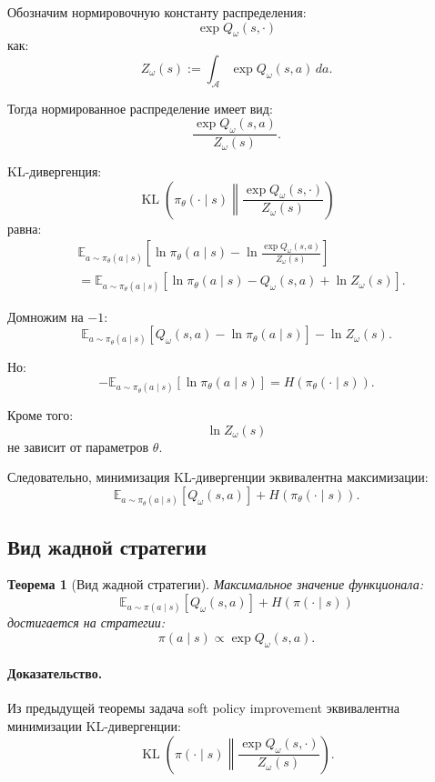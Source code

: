 \documentclass[12pt,a4paper]{article}
\newtheorem{theorem}{Теорема}
\begin{document}
Обозначим нормировочную константу распределения:
\[
\exp Q_\omega(s,\cdot)
\]
как:
\[
Z_\omega(s)
:=
\int_{\mathcal A}
\exp Q_\omega(s,a)
\,da.
\]

Тогда нормированное распределение имеет вид:
\[
\frac{\exp Q_\omega(s,a)}{Z_\omega(s)}.
\]

KL-дивергенция:
\[
\operatorname{KL}
\left(
\pi_\theta(\cdot\mid s)
\middle\|
\frac{\exp Q_\omega(s,\cdot)}{Z_\omega(s)}
\right)
\]
равна:
\[
\begin{aligned}
&
\mathbb E_{a\sim\pi_\theta(a\mid s)}
\left[
\ln\pi_\theta(a\mid s)
-
\ln
\frac{\exp Q_\omega(s,a)}{Z_\omega(s)}
\right]
\\
&=
\mathbb E_{a\sim\pi_\theta(a\mid s)}
\left[
\ln\pi_\theta(a\mid s)
-
Q_\omega(s,a)
+
\ln Z_\omega(s)
\right].
\end{aligned}
\]

Домножим на $-1$:
\[
\mathbb E_{a\sim\pi_\theta(a\mid s)}
\left[
Q_\omega(s,a)
-
\ln\pi_\theta(a\mid s)
\right]
-
\ln Z_\omega(s).
\]

Но:
\[
-\mathbb E_{a\sim\pi_\theta(a\mid s)}
\left[
\ln\pi_\theta(a\mid s)
\right]
=
H(\pi_\theta(\cdot\mid s)).
\]

Кроме того:
\[
\ln Z_\omega(s)
\]
не зависит от параметров $\theta$.

Следовательно, минимизация KL-дивергенции эквивалентна максимизации:
\[
\mathbb E_{a\sim\pi_\theta(a\mid s)}
\left[
Q_\omega(s,a)
\right]
+
H(\pi_\theta(\cdot\mid s)).
\]

\subsection{Вид жадной стратегии}

\begin{theorem}[Вид жадной стратегии]
Максимальное значение функционала:
\[
\mathbb E_{a\sim\pi(a\mid s)}
\left[
Q_\omega(s,a)
\right]
+
H(\pi(\cdot\mid s))
\]
достигается на стратегии:
\[
\pi(a\mid s)
\propto
\exp Q_\omega(s,a).
\]
\end{theorem}

\paragraph{Доказательство.}

Из предыдущей теоремы задача soft policy improvement эквивалентна минимизации KL-дивергенции:
\[
\operatorname{KL}
\left(
\pi(\cdot\mid s)
\middle\|
\frac{\exp Q_\omega(s,\cdot)}{Z_\omega(s)}
\right).
\]
\end{document}
